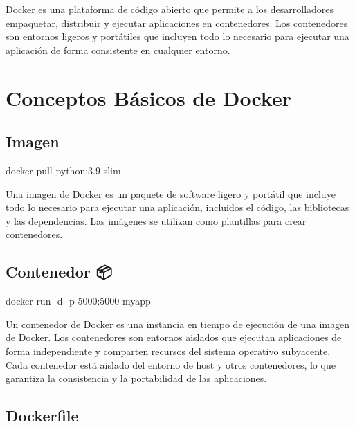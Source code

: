 \documentclass[
  a4paper,
  DIV=11,
  numbers=noendperiod,
  onepage,
  openany]{scrreprt}
\newenvironment{Shaded}{\begin{snugshade}}{\end{snugshade}}
\newcommand{\AttributeTok}[1]{\textcolor[rgb]{0.40,0.45,0.13}{#1}}
\newcommand{\ExtensionTok}[1]{\textcolor[rgb]{0.00,0.23,0.31}{#1}}
\newcommand{\NormalTok}[1]{\textcolor[rgb]{0.00,0.23,0.31}{#1}}
\begin{document}
Docker es una plataforma de código abierto que permite a los
desarrolladores empaquetar, distribuir y ejecutar aplicaciones en
contenedores. Los contenedores son entornos ligeros y portátiles que
incluyen todo lo necesario para ejecutar una aplicación de forma
consistente en cualquier entorno.

\chapter{Conceptos Básicos de Docker
📒}\label{conceptos-buxe1sicos-de-docker}

\section{Imagen}\label{imagen}

\begin{Shaded}
\begin{Highlighting}[]
\ExtensionTok{docker}\NormalTok{ pull python:3.9{-}slim}
\end{Highlighting}
\end{Shaded}

Una imagen de Docker es un paquete de software ligero y portátil que
incluye todo lo necesario para ejecutar una aplicación, incluidos el
código, las bibliotecas y las dependencias. Las imágenes se utilizan
como plantillas para crear contenedores.

\section{Contenedor 📦}\label{contenedor}

\begin{Shaded}
\begin{Highlighting}[]
\ExtensionTok{docker}\NormalTok{ run }\AttributeTok{{-}d} \AttributeTok{{-}p}\NormalTok{ 5000:5000 myapp}
\end{Highlighting}
\end{Shaded}

Un contenedor de Docker es una instancia en tiempo de ejecución de una
imagen de Docker. Los contenedores son entornos aislados que ejecutan
aplicaciones de forma independiente y comparten recursos del sistema
operativo subyacente. Cada contenedor está aislado del entorno de host y
otros contenedores, lo que garantiza la consistencia y la portabilidad
de las aplicaciones.

\section{Dockerfile 📘}\label{dockerfile}
\end{document}

